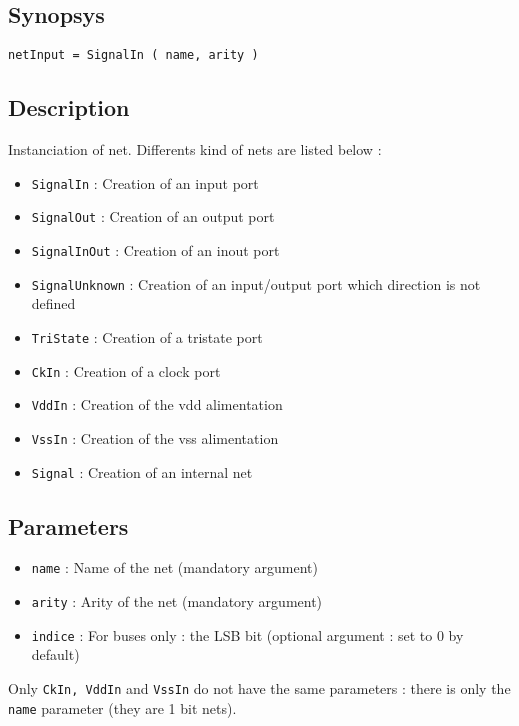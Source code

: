\subsection{Synopsys}

\begin{verbatim}
netInput = SignalIn ( name, arity )
\end{verbatim}

\subsection{Description}

Instanciation of net. Differents kind of nets are listed below :
\begin{itemize}
    \item \verb-SignalIn- : Creation of an input port
    \item \verb-SignalOut- : Creation of an output port
    \item \verb-SignalInOut- : Creation of an inout port
    \item \verb-SignalUnknown- : Creation of an input/output port which direction is not defined
    \item \verb-TriState- : Creation of a tristate port
    \item \verb-CkIn- : Creation of a clock port
    \item \verb-VddIn- : Creation of the vdd alimentation
    \item \verb-VssIn- : Creation of the vss alimentation
    \item \verb-Signal- : Creation of an internal net
\end{itemize}
        
\subsection{Parameters}

\begin{itemize}
    \item \verb-name- : Name of the net (mandatory argument)
    \item \verb-arity- : Arity of the net (mandatory argument)
    \item \verb-indice- : For buses only : the LSB bit (optional argument : set to 0 by default)\\
\end{itemize}

\indent Only \verb-CkIn, -\verb-VddIn- and \verb-VssIn- do not have the same parameters : there is only the \verb-name- parameter (they are 1 bit nets).


